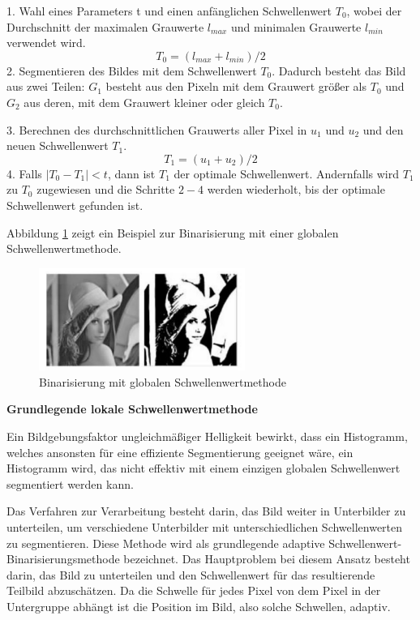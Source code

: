 1. Wahl eines Parameters t und einen anfänglichen Schwellenwert $ T_{0} $, wobei der Durchschnitt der maximalen Grauwerte $ l_{max} $ und minimalen Grauwerte  $ l_{min} $ verwendet wird. 
\begin{equation}
 T_{0} = (l_{max}+l_{min})/2 
\end{equation}
2. Segmentieren des Bildes mit dem Schwellenwert $ T_{0} $. Dadurch besteht das Bild aus zwei Teilen: $ G_{1} $ besteht aus den Pixeln mit dem Grauwert größer als $ T_{0} $ und $ G_{2} $ aus deren, mit dem Grauwert kleiner oder gleich $ T_{0} $.

3. Berechnen des durchschnittlichen Grauwerts aller Pixel in $ u_{1} $ und $ u_{2} $ und den neuen Schwellenwert $ T_{1} $.
\begin{equation}
 T_{1} = (u_{1}+u_{2})/2
\end{equation}
4. Falls $ |T_{0} - T_{1}| < t $, dann ist $ T_{1} $ der optimale Schwellenwert. Andernfalls wird $ T_{1} $ zu $ T_{0} $ zugewiesen und die Schritte $ 2-4 $ werden wiederholt, bis der optimale Schwellenwert gefunden ist.

Abbildung \ref{fig:Binarisierung mit globaler Schwellenwertmethode} zeigt ein Beispiel zur Binarisierung mit einer globalen Schwellenwertmethode.

\begin{figure}[H]
 \centering 
  \includegraphics[keepaspectratio,width=0.6\textwidth]{images/4_ZweiteErfahrung/Binar/global.pdf}
 \caption{Binarisierung mit globalen Schwellenwertmethode}
 \label{fig:Binarisierung mit globaler Schwellenwertmethode}
\end{figure} 

\textbf{Grundlegende lokale Schwellenwertmethode}

Ein Bildgebungsfaktor ungleichmäßiger Helligkeit bewirkt, dass ein Histogramm, welches ansonsten für eine effiziente Segmentierung geeignet wäre, ein Histogramm wird, das nicht effektiv mit einem einzigen globalen Schwellenwert segmentiert werden kann.

Das Verfahren zur Verarbeitung besteht darin, das Bild weiter in Unterbilder zu unterteilen, um verschiedene Unterbilder mit unterschiedlichen Schwellenwerten zu segmentieren. Diese Methode wird als grundlegende adaptive Schwellenwert-Binarisierungsmethode bezeichnet. Das Hauptproblem bei diesem Ansatz besteht darin, das Bild zu unterteilen und den Schwellenwert für das resultierende Teilbild abzuschätzen. Da die Schwelle für jedes Pixel von dem Pixel in der Untergruppe abhängt ist die Position im Bild, also solche Schwellen, adaptiv. 

